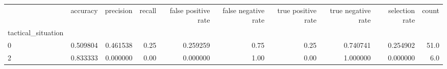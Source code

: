 \begin{tabular}{lrrrrrrrrr}
\toprule
{} &  accuracy &  precision &  recall &  false positive rate &  false negative rate &  true positive rate &  true negative rate &  selection rate &  count \\
tactical\_situation &           &            &         &                      &                      &                     &                     &                 &        \\
\midrule
0                  &  0.509804 &   0.461538 &    0.25 &             0.259259 &                 0.75 &                0.25 &            0.740741 &        0.254902 &   51.0 \\
2                  &  0.833333 &   0.000000 &    0.00 &             0.000000 &                 1.00 &                0.00 &            1.000000 &        0.000000 &    6.0 \\
\bottomrule
\end{tabular}
